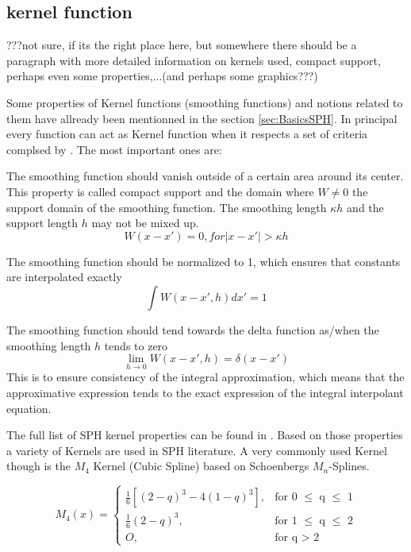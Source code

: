 \documentclass{report}
\begin{document}
\subsection{kernel function}
\label{sec:KernelFunction}
???not sure, if its the right place here, but somewhere there should be a
paragraph with more detailed information on kernels used, compact support,
perhaps even some properties,...(and perhaps some graphics???)


Some properties of Kernel functions (smoothing functions) and notions related
to them have allready been mentionned in the section
\ref{sec:BasicsSPH}. In principal every function can act as Kernel function
when it respects a set of criteria complsed by \cite{Liu2003}.
The most important ones are:

The smoothing function should vanish outside of a certain area around its
center. This property is called compact support and the domain where $W\neq0$
the support domain of the smoothing function. The smoothing length $\kappa h$ and the
support length $h$ may not be mixed up.
\begin{equation}
W(x-x')=0,\textit{for}|x-x'|>\kappa h
\end{equation}

The smoothing function should be normalized to 1, which ensures that constants
are interpolated exactly
\begin{equation}
\int{W(x-x',h)dx'}=1
\end{equation}

The smoothing function should tend towards the delta function as/when the smoothing
length $h$ tends to zero
\begin{equation}
\lim\limits_{h \rightarrow 0}{W(x-x',h)}=\delta(x-x')
\end{equation}
This is to ensure consistency of the integral approximation, which means that
the approximative expression tends to the exact expression of the integral
interpolant equation.

The full list of SPH kernel properties can be found in  \cite{Liu2003}.
Based on those properties a variety of Kernels are used in SPH literature. A
very commonly used Kernel though is the $M_4$ Kernel (Cubic Spline) based on Schoenbergs
$M_n$-Splines\cite{Schoenberg1946}.

\begin{equation}
\label{eq:cubicSpline}
M_{4}(x)=\begin{cases}
\frac{1}{6}[(2-q)^{3}-4(1-q)^{3}],& \text{for 0 $\leq$ q $\leq$ 1} \\
\frac{1}{6}(2-q)^{3},&  \text{for 1 $\leq$ q $\leq$ 2} \\
O,& \text{for q $>$ 2}
\end{cases}
\end{equation}
\end{document}
